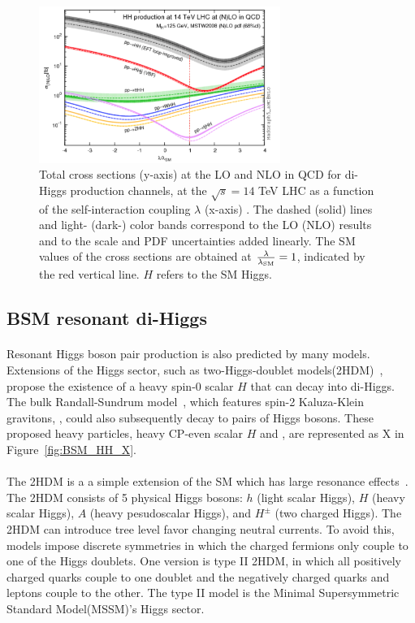 \begin{figure}[htbp!]
  \centering
  \captionsetup{justification=centering}
  \includegraphics[width=0.7\textwidth]{figures/theory/HH_lam}
  \caption{Total cross sections (y-axis) at the LO and NLO in QCD for di-Higgs production channels, at the $\sqrt{s} = 14$ TeV LHC as a function of the self-interaction coupling $\lambda$ (x-axis) . The dashed (solid) lines and light- (dark-) color bands correspond to the LO (NLO) results and to the scale and PDF uncertainties added linearly. The SM values of the cross sections are obtained at $\frac{\rm \lambda}{\rm \lambda_{\rm SM}} = 1$, indicated by the red vertical line. $H$ refers to the SM Higgs.}
  \label{fig:SM_HH_lam}
\end{figure}

\subsection{BSM resonant di-Higgs}
\paragraph{}
Resonant Higgs boson pair production is also predicted by many models. Extensions of the Higgs sector, such as two-Higgs-doublet models(2HDM)~\cite{PhysRevD.8.1226, Branco:2011iw}, propose the existence of a heavy spin-0 scalar $H$ that can decay into di-Higgs. The bulk Randall-Sundrum model~\cite{Agashe:2007zd, Fitzpatrick}, which features spin-2 Kaluza-Klein gravitons, \Grav, could also subsequently decay to pairs of Higgs bosons. These proposed heavy particles, heavy CP-even scalar $H$ and \Grav, are represented as X in Figure~\ref{fig:BSM_HH_X}.

\paragraph{}
The 2HDM is a a simple extension of the SM which has large resonance effects~\cite{LHCYellow}. 
The 2HDM consists of 5 physical Higgs bosons: $h$ (light scalar Higgs), $H$ (heavy scalar Higgs), $A$ (heavy pesudoscalar Higgs), and $H^{\pm}$ (two charged Higgs). 
The 2HDM can introduce tree level favor changing neutral currents. 
To avoid this, models impose discrete symmetries in which the charged fermions only couple to one of the Higgs doublets.
One version is type II 2HDM, in which all positively charged quarks couple to one doublet and the negatively charged quarks and leptons couple to the other. 
The type II model is the Minimal Supersymmetric Standard Model(MSSM)'s Higgs sector.

